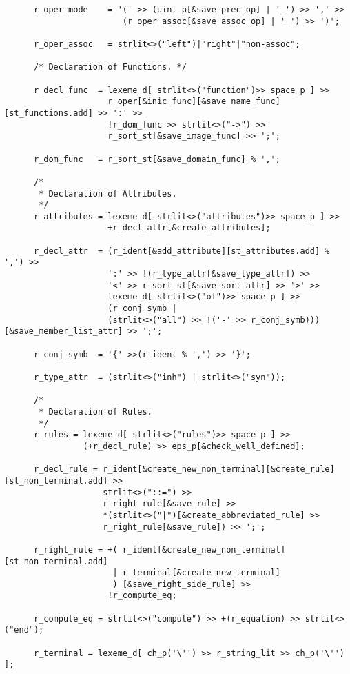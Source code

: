 \begin{center}
\begin{lstlisting}
      r_oper_mode    = '(' >> (uint_p[&save_prec_op] | '_') >> ',' >>
                        (r_oper_assoc[&save_assoc_op] | '_') >> ')';

      r_oper_assoc   = strlit<>("left")|"right"|"non-assoc";

      /* Declaration of Functions. */

      r_decl_func  = lexeme_d[ strlit<>("function")>> space_p ] >>
                     r_oper[&inic_func][&save_name_func][st_functions.add] >> ':' >>
                     !r_dom_func >> strlit<>("->") >>
                     r_sort_st[&save_image_func] >> ';';

      r_dom_func   = r_sort_st[&save_domain_func] % ',';

      /*
       * Declaration of Attributes.
       */
      r_attributes = lexeme_d[ strlit<>("attributes")>> space_p ] >>
                     +r_decl_attr[&create_attributes];

      r_decl_attr  = (r_ident[&add_attribute][st_attributes.add] % ',') >>
                     ':' >> !(r_type_attr[&save_type_attr]) >>
                     '<' >> r_sort_st[&save_sort_attr] >> '>' >>
                     lexeme_d[ strlit<>("of")>> space_p ] >>
                     (r_conj_symb |
                     (strlit<>("all") >> !('-' >> r_conj_symb)))[&save_member_list_attr] >> ';';

      r_conj_symb  = '{' >>(r_ident % ',') >> '}';

      r_type_attr  = (strlit<>("inh") | strlit<>("syn"));

      /*
       * Declaration of Rules.
       */
      r_rules = lexeme_d[ strlit<>("rules")>> space_p ] >>
                (+r_decl_rule) >> eps_p[&check_well_defined];

      r_decl_rule = r_ident[&create_new_non_terminal][&create_rule][st_non_terminal.add] >>
                    strlit<>("::=") >>
                    r_right_rule[&save_rule] >>
                    *(strlit<>("|")[&create_abbreviated_rule] >>
                    r_right_rule[&save_rule]) >> ';';

      r_right_rule = +( r_ident[&create_new_non_terminal][st_non_terminal.add]
                      | r_terminal[&create_new_terminal]
                      ) [&save_right_side_rule] >>
                     !r_compute_eq;

      r_compute_eq = strlit<>("compute") >> +(r_equation) >> strlit<>("end");

      r_terminal = lexeme_d[ ch_p('\'') >> r_string_lit >> ch_p('\'') ];


\end{lstlisting}
\end{center}
